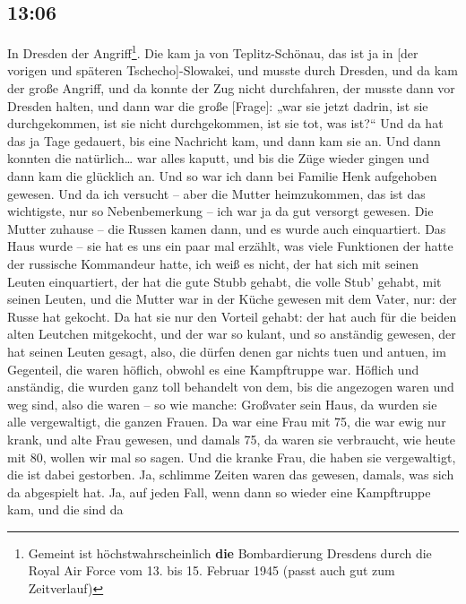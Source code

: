 \documentclass[ngerman,]{article}
\providecommand{\tightlist}{%
  \setlength{\itemsep}{0pt}\setlength{\parskip}{0pt}}
\begin{document}
\begin{multicols}{2}
\hypertarget{section-6}{%
\subsection{13:06}\label{section-6}}

\begin{description}
\tightlist
\item[Käthe]
In Dresden der Angriff\footnote{Gemeint ist höchstwahrscheinlich
  \textbf{die} Bombardierung Dresdens durch die Royal Air Force vom 13.
  bis 15. Februar 1945 (passt auch gut zum Zeitverlauf)}. Die kam ja von
Teplitz-Schönau, das ist ja in {[}der vorigen und späteren
Tschecho{]}-Slowakei, und musste durch Dresden, und da kam der große
Angriff, und da konnte der Zug nicht durchfahren, der musste dann vor
Dresden halten, und dann war die große {[}Frage{]}: „war sie jetzt
dadrin, ist sie durchgekommen, ist sie nicht durchgekommen, ist sie tot,
was ist?“ Und da hat das ja Tage gedauert, bis eine Nachricht kam, und
dann kam sie an. Und dann konnten die natürlich\ldots{} war alles
kaputt, und bis die Züge wieder gingen und dann kam die glücklich an.
Und so war ich dann bei Familie Henk aufgehoben gewesen. Und da ich
versucht – aber die Mutter heimzukommen, das ist das wichtigste, nur so
Nebenbemerkung – ich war ja da gut versorgt gewesen. Die Mutter zuhause
– die Russen kamen dann, und es wurde auch einquartiert. Das Haus wurde
– sie hat es uns ein paar mal erzählt, was viele Funktionen der hatte
der russische Kommandeur hatte, ich weiß es nicht, der hat sich mit
seinen Leuten einquartiert, der hat die gute Stubb gehabt, die volle
Stub' gehabt, mit seinen Leuten, und die Mutter war in der Küche gewesen
mit dem Vater, nur: der Russe hat gekocht. Da hat sie nur den Vorteil
gehabt: der hat auch für die beiden alten Leutchen mitgekocht, und der
war so kulant, und so anständig gewesen, der hat seinen Leuten gesagt,
also, die dürfen denen gar nichts tuen und antuen, im Gegenteil, die
waren höflich, obwohl es eine Kampftruppe war. Höflich und anständig,
die wurden ganz toll behandelt von dem, bis die angezogen waren und weg
sind, also die waren – so wie manche: Großvater sein Haus, da wurden sie
alle vergewaltigt, die ganzen Frauen. Da war eine Frau mit 75, die war
ewig nur krank, und alte Frau gewesen, und damals 75, da waren sie
verbraucht, wie heute mit 80, wollen wir mal so sagen. Und die kranke
Frau, die haben sie vergewaltigt, die ist dabei gestorben. Ja, schlimme
Zeiten waren das gewesen, damals, was sich da abgespielt hat. Ja, auf
jeden Fall, wenn dann so wieder eine Kampftruppe kam, und die sind da

\end{description}
\end{multicols}
\end{document}

